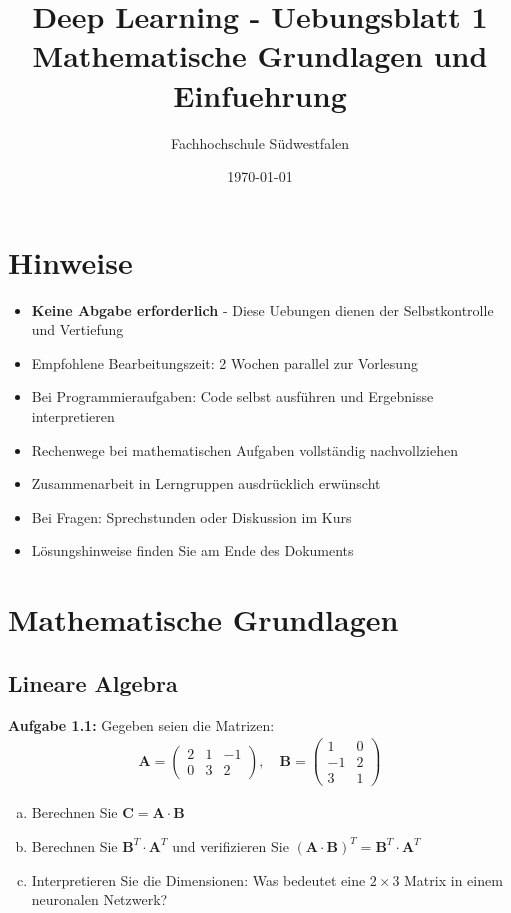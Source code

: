 ﻿\documentclass[12pt,a4paper]{article}
\title{\textbf{Deep Learning - Uebungsblatt 1} \\ \large Mathematische Grundlagen und Einfuehrung}
\author{Fachhochschule Südwestfalen}
\date{\today}
\begin{document}
\maketitle

\section*{Hinweise}
\begin{itemize}
    \item \textbf{Keine Abgabe erforderlich} - Diese Uebungen dienen der Selbstkontrolle und Vertiefung
    \item Empfohlene Bearbeitungszeit: 2 Wochen parallel zur Vorlesung
    \item Bei Programmieraufgaben: Code selbst ausführen und Ergebnisse interpretieren
    \item Rechenwege bei mathematischen Aufgaben vollständig nachvollziehen
    \item Zusammenarbeit in Lerngruppen ausdrücklich erwünscht
    \item Bei Fragen: Sprechstunden oder Diskussion im Kurs
    \item Lösungshinweise finden Sie am Ende des Dokuments
\end{itemize}

\section{Mathematische Grundlagen}

\subsection{Lineare Algebra}

\textbf{Aufgabe 1.1:} Gegeben seien die Matrizen:
\begin{align}
\mathbf{A} = \begin{pmatrix} 2 & 1 & -1 \\ 0 & 3 & 2 \end{pmatrix}, \quad
\mathbf{B} = \begin{pmatrix} 1 & 0 \\ -1 & 2 \\ 3 & 1 \end{pmatrix}
\end{align}

\begin{enumerate}[(a)]
    \item Berechnen Sie $\mathbf{C} = \mathbf{A} \cdot \mathbf{B}$
    \item Berechnen Sie $\mathbf{B}^T \cdot \mathbf{A}^T$ und verifizieren Sie $(\mathbf{A} \cdot \mathbf{B})^T = \mathbf{B}^T \cdot \mathbf{A}^T$
    \item Interpretieren Sie die Dimensionen: Was bedeutet eine $2 \times 3$ Matrix in einem neuronalen Netzwerk?
\end{enumerate}
\end{document}
